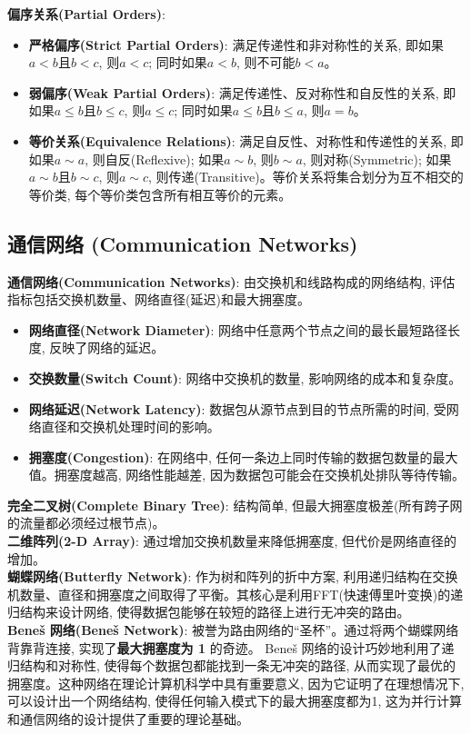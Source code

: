 \documentclass[12pt, a4paper, UTF8]{ctexart}
\newcommand{\term}[1]{\textbf{\textcolor{blue!80!black}{#1}}}
\newcommand{\emphb}[1]{\textbf{#1}}
\begin{document}
\begin{sloppypar}
    \term{偏序关系(Partial Orders)}:
    \begin{itemize}[nosep]
        \item \emphb{严格偏序(Strict Partial Orders)}: 满足传递性和非对称性的关系, 即如果$a < b$且$b < c$, 则$a < c$; 同时如果$a < b$, 则不可能$b < a$。
        \item \emphb{弱偏序(Weak Partial Orders)}: 满足传递性、反对称性和自反性的关系, 即如果$a \leq b$且$b \leq c$, 则$a \leq c$; 同时如果$a \leq b$且$b \leq a$, 则$a = b$。
        \item \term{等价关系(Equivalence Relations)}: 满足自反性、对称性和传递性的关系, 即如果$a \sim a$, 则自反(Reflexive); 如果$a \sim b$, 则$b \sim a$, 则对称(Symmetric); 如果$a \sim b$且$b \sim c$, 则$a \sim c$, 则传递(Transitive)。等价关系将集合划分为互不相交的等价类, 每个等价类包含所有相互等价的元素。
    \end{itemize}
    \newpage

    \subsection{通信网络 (Communication Networks)}
    \term{通信网络(Communication Networks)}: 由交换机和线路构成的网络结构, 评估指标包括交换机数量、网络直径(延迟)和最大拥塞度。
    \begin{itemize}[nosep]
        \item \term{网络直径(Network Diameter)}: 网络中任意两个节点之间的最长最短路径长度, 反映了网络的延迟。
        \item \term{交换数量(Switch Count)}: 网络中交换机的数量, 影响网络的成本和复杂度。
        \item \term{网络延迟(Network Latency)}: 数据包从源节点到目的节点所需的时间, 受网络直径和交换机处理时间的影响。
        \item \term{拥塞度(Congestion)}: 在网络中, 任何一条边上同时传输的数据包数量的最大值。拥塞度越高, 网络性能越差, 因为数据包可能会在交换机处排队等待传输。
    \end{itemize}
    \term{完全二叉树(Complete Binary Tree)}: 结构简单, 但最大拥塞度极差(所有跨子网的流量都必须经过根节点)。\\
    \term{二维阵列(2-D Array)}: 通过增加交换机数量来降低拥塞度, 但代价是网络直径的增加。\\
    \term{蝴蝶网络(Butterfly Network)}: 作为树和阵列的折中方案, 利用递归结构在交换机数量、直径和拥塞度之间取得了平衡。其核心是利用FFT(快速傅里叶变换)的递归结构来设计网络, 使得数据包能够在较短的路径上进行无冲突的路由。\\
    \term{Beneš 网络(Beneš Network)}: 被誉为路由网络的“圣杯”。通过将两个蝴蝶网络背靠背连接, 实现了\emphb{最大拥塞度为 1} 的奇迹。 Beneš 网络的设计巧妙地利用了递归结构和对称性, 使得每个数据包都能找到一条无冲突的路径, 从而实现了最优的拥塞度。这种网络在理论计算机科学中具有重要意义, 因为它证明了在理想情况下, 可以设计出一个网络结构, 使得任何输入模式下的最大拥塞度都为1, 这为并行计算和通信网络的设计提供了重要的理论基础。


\end{sloppypar}
\end{document}
